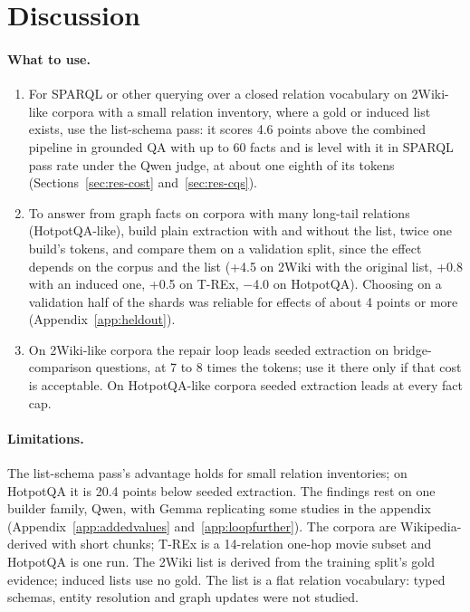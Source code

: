 \section{Discussion}
\label{sec:discussion}

\paragraph{What to use.}
\begin{enumerate}[nosep,label=(\roman*)]
  \item For SPARQL or other querying over a closed relation vocabulary on 2Wiki-like corpora with a small relation inventory, where a gold or induced list exists, use the list-schema pass: it scores 4.6 points above the combined pipeline in grounded QA with up to 60 facts and is level with it in SPARQL pass rate under the Qwen judge, at about one eighth of its tokens (Sections~\ref{sec:res-cost} and~\ref{sec:res-cqs}).
  \item To answer from graph facts on corpora with many long-tail relations (HotpotQA-like), build plain extraction with and without the list, twice one build's tokens, and compare them on a validation split, since the effect depends on the corpus and the list (+4.5 on 2Wiki with the original list, +0.8 with an induced one, +0.5 on T-REx, $-$4.0 on HotpotQA). Choosing on a validation half of the shards was reliable for effects of about 4 points or more (Appendix~\ref{app:heldout}).
  \item On 2Wiki-like corpora the repair loop leads seeded extraction on bridge-comparison questions, at 7 to 8 times the tokens; use it there only if that cost is acceptable. On HotpotQA-like corpora seeded extraction leads at every fact cap.
\end{enumerate}

\paragraph{Limitations.}
The list-schema pass's advantage holds for small relation inventories; on HotpotQA it is 20.4 points below seeded extraction. The findings rest on one builder family, Qwen, with Gemma replicating some studies in the appendix (Appendix~\ref{app:addedvalues} and~\ref{app:loopfurther}). The corpora are Wikipedia-derived with short chunks; T-REx is a 14-relation one-hop movie subset and HotpotQA is one run. The 2Wiki list is derived from the training split's gold evidence; induced lists use no gold. The list is a flat relation vocabulary: typed schemas, entity resolution and graph updates were not studied.

